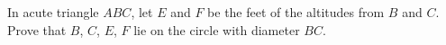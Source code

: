 In acute triangle $ABC$, let $E$ and $F$ be the feet of the altitudes from $B$ and $C$. Prove that $B$, $C$, $E$, $F$ lie on the circle with diameter $BC$.
